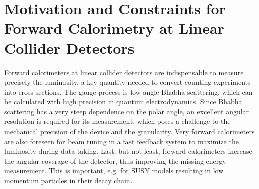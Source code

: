 \section{Motivation and Constraints for Forward Calorimetry at Linear Collider Detectors}

 Forward calorimeters at linear collider detectors are indispensable to measure 
 precisely the luminosity, a key quantity needed to convert counting experiments into cross sections.
 The gauge process is low angle Bhabha scattering, which can be calculated with high 
 precision in quantum electrodynamics. Since Bhabha scattering has
 a very steep dependence on the polar angle, an excellent angular resolution is required for its measurement, which poses a challenge to the mechanical precision of the device and the granularity.
 Very forward calorimeters are also foreseen for beam tuning in a fast feedback system to 
 maximize the luminosity during data taking. Last, but not least, forward calorimeters
 increase the angular coverage of the detector, thus improving the missing energy 
 measurement. This is important, e.g. for SUSY models resulting in low momentum particles
 in their decay chain.
 